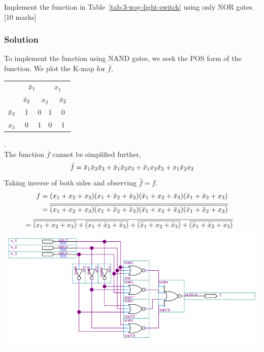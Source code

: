 \begin{prob}
 Implement the function in Table~\ref{tab:3-way-light-switch} using only NOR
 gates. [10 marks]
\end{prob}
\subsubsection*{Solution}
To implement the function using NAND gates, we seek the POS form of the
function. We plot the K-map for $\bar{f}$,
\\
\begin{tabular}{c|c|c|c|c}
  \toprule
  & \multicolumn{2}{c|}{$\bar{x}_1$} & \multicolumn{2}{c}{$x_1$}
  \\
  & $\bar{x}_2$ & \multicolumn{2}{c|}{$x_2$} & $\bar{x}_2$
  \\ \midrule
  $\bar{x}_3$
  & 1 & 0 & 1 & 0
  \\
  $x_3$
  & 0 & 1 & 0 & 1
  \\\bottomrule
\end{tabular}.
\\
The function $\bar{f}$ cannot be simplified further,
\[
  \bar{f} = \bar{x}_1 \bar{x}_2 \bar{x}_3  + \bar{x}_1 \bar{x}_2 x_3  + \bar{x}_1 x_2 \bar{x}_3 + x_1 \bar{x}_2 x_3
\]
Taking inverse of both sides and observing $\overline{\bar{f}} = f$.
{\tiny
\begin{align*}
  f &= (x_1 + x_2 + x_3)(x_1 + \bar{x}_2 + \bar{x}_3)(\bar{x}_1 + x_2 + \bar{x}_3)(\bar{x}_1 + \bar{x}_2 + x_3)
      \\
    &=\overline{\overline{(x_1 + x_2 + x_3)}}\overline{\overline{(x_1 + \bar{x}_2 + \bar{x}_3)}}\overline{\overline{(\bar{x}_1 + x_2 + \bar{x}_3)}}\overline{\overline{(\bar{x}_1 + \bar{x}_2 + x_3)}}
      \end{align*}
}{\tiny
\begin{align*}
  &=\overline{\overline{{(x_1 + x_2 + x_3)}} + {\overline{(x_1 + \bar{x}_2 + \bar{x}_3)}}
  + {\overline{(\bar{x}_1 + x_2 + \bar{x}_3)}} + {\overline{(\bar{x}_1 + \bar{x}_2 + x_3)}}}
\end{align*}
}
\includegraphics[width=\linewidth]{files/hw2p4.png}


